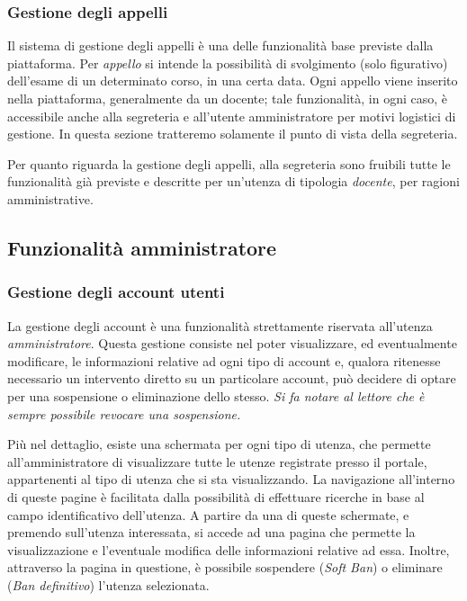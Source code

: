 \documentclass [a4paper,11pt]{book}
\begin{document}
\medskip

\subsubsection{Gestione degli appelli}

Il sistema di gestione degli appelli è una delle funzionalità base previste dalla piattaforma. Per \emph{appello} si intende la possibilità di svolgimento (solo figurativo) dell'esame di un determinato corso, in una certa data. Ogni appello viene inserito nella piattaforma, generalmente da un docente; tale funzionalità, in ogni caso, è accessibile anche alla segreteria e all'utente amministratore per motivi logistici di gestione. In questa sezione tratteremo solamente il punto di vista della segreteria.

Per quanto riguarda la gestione degli appelli, alla segreteria sono fruibili tutte le funzionalità già previste e descritte per un'utenza di tipologia \emph{docente}, per ragioni amministrative.

\medskip

\subsection{Funzionalità amministratore}

\subsubsection{Gestione degli account utenti}

La gestione degli account è una funzionalità strettamente riservata all'utenza \emph{amministratore}. Questa gestione consiste nel poter visualizzare, ed eventualmente modificare, le informazioni relative ad ogni tipo di account e, qualora ritenesse necessario un intervento diretto su un particolare account, può decidere di optare per una sospensione o eliminazione dello stesso. \emph{Si fa notare al lettore che è sempre possibile revocare una sospensione.} 

Più nel dettaglio, esiste una schermata per ogni tipo di utenza, che permette all'amministratore di visualizzare tutte le utenze registrate presso il portale, appartenenti al tipo di utenza che si sta visualizzando. La navigazione all'interno di queste pagine è facilitata dalla possibilità di effettuare ricerche in base al campo identificativo dell'utenza. A partire da una di queste schermate, e premendo sull'utenza interessata, si accede ad una pagina che permette la visualizzazione e l'eventuale modifica delle informazioni relative ad essa. Inoltre, attraverso la pagina in questione, è possibile sospendere (\emph{Soft Ban}) o eliminare (\emph{Ban definitivo}) l'utenza selezionata.
\end{document}
